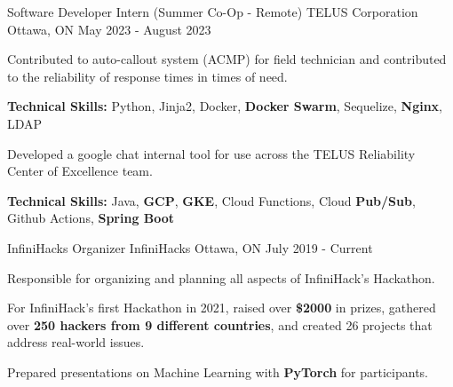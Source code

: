 

\begin{cventries}

  \cventry
    {Software Developer Intern (Summer Co-Op - Remote)} %
    {TELUS Corporation} %
    {Ottawa, ON} %
    {May 2023 - August 2023} %
    {
      \begin{cvitems} %
        \item {Contributed to auto-callout system (ACMP) for field technician and contributed to the reliability of response times in times of need.}
          \item[] {\textbf{Technical Skills:} Python, Jinja2, Docker, \textbf{Docker Swarm}, Sequelize, \textbf{Nginx}, LDAP}
        \item {Developed a google chat internal tool for use across the TELUS Reliability Center of Excellence team.}
          \item[] {\textbf{Technical Skills:} Java, \textbf{GCP}, \textbf{GKE}, Cloud Functions, Cloud \textbf{Pub/Sub}, Github Actions, \textbf{Spring Boot}}
      \end{cvitems}
    }

  \cventry
    {InfiniHacks Organizer} %
    {InfiniHacks} %
    {Ottawa, ON} %
    {July 2019 - Current} %
    {
      \begin{cvitems} %
        \item {Responsible for organizing and planning all aspects of InfiniHack's Hackathon.}
        \item {For InfiniHack's first Hackathon in 2021, raised over \textbf{\$2000} in prizes, gathered over \textbf{250 hackers from 9 different countries}, and created 26 projects that address real-world issues.}
        \item {Prepared presentations on Machine Learning with \textbf{PyTorch} for participants.}
      \end{cvitems}
    }


\end{cventries}
